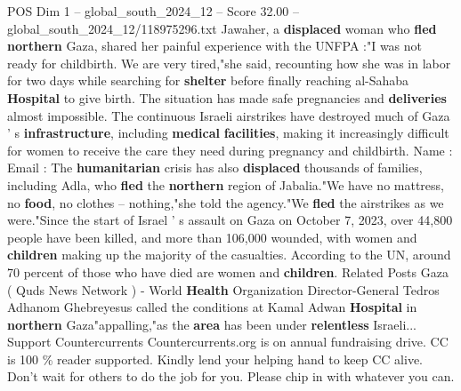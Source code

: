 \begin{textsample}{POS Dim 1 – global\_south\_2024\_12 – Score 32.00 – global\_south\_2024\_12/118975296.txt}
Jawaher, a \textbf{displaced} woman who \textbf{fled} \textbf{northern} Gaza, shared her painful experience with the UNFPA :"I was not ready for childbirth.
We are very tired,"she said, recounting how she was in labor for two days while searching for \textbf{shelter} before finally reaching al-Sahaba \textbf{Hospital} to give birth.
The situation has made safe pregnancies and \textbf{deliveries} almost impossible.
The continuous Israeli airstrikes have destroyed much of Gaza ' s \textbf{infrastructure}, including \textbf{medical} \textbf{facilities}, making it increasingly difficult for women to receive the care they need during pregnancy and childbirth.
Name : Email : The \textbf{humanitarian} crisis has also \textbf{displaced} thousands of families, including Adla, who \textbf{fled} the \textbf{northern} region of Jabalia."We have no mattress, no \textbf{food}, no clothes -- nothing,"she told the agency."We \textbf{fled} the airstrikes as we were."Since the start of Israel ' s assault on Gaza on October 7, 2023, over 44,800 people have been killed, and more than 106,000 wounded, with women and \textbf{children} making up the majority of the casualties.
According to the UN, around 70 percent of those who have died are women and \textbf{children}.
Related Posts Gaza ( Quds News Network ) - World \textbf{Health} Organization Director-General Tedros Adhanom Ghebreyesus called the conditions at Kamal Adwan \textbf{Hospital} in \textbf{northern} Gaza"appalling,"as the \textbf{area} has been under \textbf{relentless} Israeli...
Support Countercurrents Countercurrents.org is on annual fundraising drive.
CC is 100 \% reader supported.
Kindly lend your helping hand to keep CC alive.
Don't wait for others to do the job for you.
Please chip in with whatever you can.

\end{textsample}
